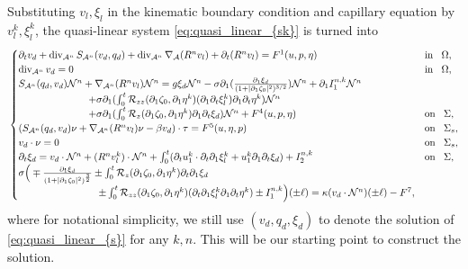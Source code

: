\documentclass[letterpaper,reqno,10pt,twoside]{amsart}
\theoremstyle{definition}
\theoremstyle{remark}
\def\p{\partial}
\def\dive{\mathop{\rm div}\nolimits}
\begin{document}
	Substituting $v_{l},\xi_{l}$ in the kinematic boundary condition and capillary equation by $v_{l}^{k},\xi_{l}^{k}$, the quasi-linear system
	\eqref{eq:quasi_linear_{sk}} is turned into
	\begin{equation}{\label{eq:quasi_linear_{s}}}
		\begin{cases}
			\partial_{t}v_{d}+\operatorname{div}_{\mathcal{A}^{n}}S_{\mathcal{A}^{n}}(v_{d},q_{d})+\dive_{\mathcal{A}^{n}}\nabla_{\mathcal{A}}(R^{n}v_{l})+\p_{t}(R^{n}v_{l})=F^{1}(u,p,\eta)~~~&\operatorname{in}~~\Omega,\\
			\operatorname{div}_{\mathcal{A}^{n}}v_{d}=0~~~&\operatorname{in}~~\Omega,\\
			S_{\mathcal{A}^{n}}(q_{d},v_{d})\mathcal{N}^{n}+\nabla_{\mathcal{A}^{n}}(R^{n}v_{l})\mathcal{N}^{n}=g\xi_{d}\mathcal{N}^{n}-\sigma\partial_{1}(\frac{\p_1\xi_d}{(1+\vert \partial_{1}\zeta_{0}\vert^{2})^{3/2}})\mathcal{N}^{n}+\p_{1}I^{n,k}_{1}\mathcal{N}^{n}\\
			\quad\quad\quad\quad\quad\quad\quad+\sigma\partial_{1}(\int_{0}^{t}\mathcal{R}_{zz}(\partial_{1}\zeta_{0},\partial_{1}\eta^{k})(\partial_{1}\p_{t}\xi_{l}^{k})\p_{1}\p_{t}\eta^{k})\mathcal{N}^{n}\\
			\quad\quad\quad\quad\quad\quad\quad +\sigma\partial_{1}(\int_{0}^{t}\mathcal{R}_{z}(\partial_{1}\zeta_{0},\partial_{1}\eta^{k})\partial_{1}\partial_{t}\xi_{d})\mathcal{N}^{n}+F^{4}(u,p,\eta)~~~&\operatorname{on}~~\Sigma,\\
			(S_{\mathcal{A}^{n}}(q_{d},v_{d})\nu+\nabla_{\mathcal{A}^{n}}(R^{n}v_{l})\nu-\beta v_{d})\cdot \tau=F^{5}(u,\eta,p)~~~&\operatorname{on}~~\Sigma_{s},\\
			v_{d}\cdot \nu=0~~~&\operatorname{on}~~\Sigma_{s},\\
			\partial_{t}\xi_{d}=v_{d}\cdot \mathcal{N}^{n}+(R^{n}v_{l}^{k})\cdot \mathcal{N}^{n}+\int_{0}^{t}(\partial_{t}u_{1}^{k}\cdot\partial_{t}\p_{1}\xi_{l}^{k}+u_{1}^{k}\partial_{1}\partial_{t}\xi_{d})+I^{n,k}_{2}~~~&\operatorname{on}~~\Sigma,\\
			\sigma \Big(\mp \frac{\partial_{1}\xi_{d}}{(1+\vert \partial_{1}\zeta_{0}\vert^{2})^{\frac{3}{2}}}\pm \int_{0}^{t}\mathcal{R}_{z}(\partial_{1}\zeta_{0},\partial_{1}\eta^{k})\partial_{t}\partial_{1}\xi_{d}\\
			\quad\quad\quad\quad\quad\quad\quad\quad\pm\int_{0}^{t}\mathcal{R}_{zz}(\p_{1}\zeta_{0},\p_{1}\eta^{k})(\p_{t}\p_{1}\xi^{k}_{l}\p_{1}\p_{t}\eta^{k})\pm I^{n,k}_{1} \Big)(\pm \ell)=\kappa (v_{d}\cdot \mathcal{N}^{n})(\pm \ell)-{F}^{7},
		\end{cases}
	\end{equation}
	where for notational simplicity, we still use 
	$(v_{d},q_{d},\xi_{d})$ to denote the solution of \eqref{eq:quasi_linear_{s}} for any $k,n$. This will be our starting point to construct the solution.
	
\end{document}
